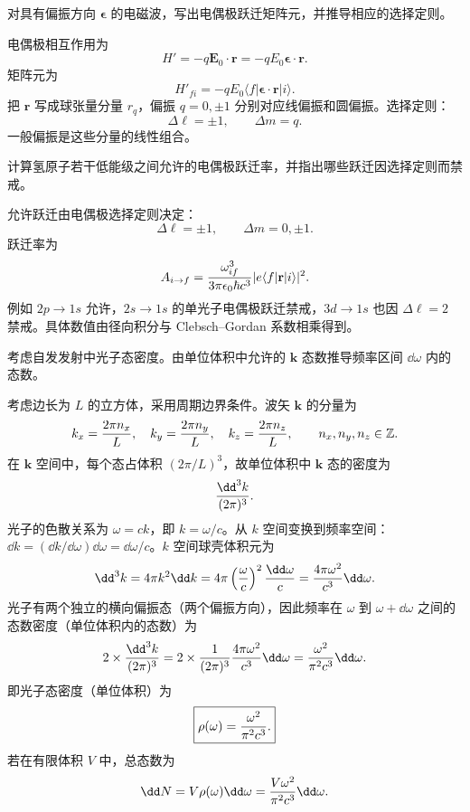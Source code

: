 \begin{question}
对具有偏振方向 $\boldsymbol\epsilon$ 的电磁波，写出电偶极跃迁矩阵元，并推导相应的选择定则。
\end{question}
\begin{solution}
电偶极相互作用为
\[
H'=-q\mathbf E_0\cdot\mathbf r=-qE_0\boldsymbol\epsilon\cdot\mathbf r.
\]
矩阵元为
\[
H'_{fi}=-qE_0\langle f|\boldsymbol\epsilon\cdot\mathbf r|i\rangle.
\]
把 $\mathbf r$ 写成球张量分量 $r_q$，偏振 $q=0,\pm1$ 分别对应线偏振和圆偏振。选择定则：
\[
\Delta\ell=\pm1,
\qquad
\Delta m=q.
\]
一般偏振是这些分量的线性组合。
\end{solution}

\begin{question}
计算氢原子若干低能级之间允许的电偶极跃迁率，并指出哪些跃迁因选择定则而禁戒。
\end{question}
\begin{solution}
允许跃迁由电偶极选择定则决定：
\[
\Delta\ell=\pm1,
\qquad \Delta m=0,\pm1.
\]
跃迁率为
\[
A_{i\to f}={\omega_{if}^3\over3\pi\epsilon_0\hbar c^3}|e\langle f|\mathbf r|i\rangle|^2.
\]
例如 $2p\to1s$ 允许，$2s\to1s$ 的单光子电偶极跃迁禁戒，$3d\to1s$ 也因 $\Delta\ell=2$ 禁戒。具体数值由径向积分与 Clebsch--Gordan 系数相乘得到。
\end{solution}

\begin{question}
考虑自发发射中光子态密度。由单位体积中允许的 $\mathbf k$ 态数推导频率区间 $\dd\omega$ 内的态数。
\end{question}
\begin{solution}
考虑边长为 $L$ 的立方体，采用周期边界条件。波矢 $\mathbf k$ 的分量为
\[
k_x={2\pi n_x\over L},\quad k_y={2\pi n_y\over L},\quad k_z={2\pi n_z\over L},\qquad n_x,n_y,n_z\in\mathbb Z.
\]
在 $\mathbf k$ 空间中，每个态占体积 $(2\pi/L)^3$，故单位体积中 $\mathbf k$ 态的密度为
\[
{\dd^3k\over(2\pi)^3}.
\]
光子的色散关系为 $\omega=ck$，即 $k=\omega/c$。从 $k$ 空间变换到频率空间：$\dd k=(\dd k/\dd\omega)\dd\omega=\dd\omega/c$。$k$ 空间球壳体积元为
\[
\dd^3k=4\pi k^2\dd k=4\pi\left({\omega\over c}\right)^2{\dd\omega\over c}
={4\pi\omega^2\over c^3}\dd\omega.
\]
光子有两个独立的横向偏振态（两个偏振方向），因此频率在 $\omega$ 到 $\omega+\dd\omega$ 之间的态数密度（单位体积内的态数）为
\[
2\times{\dd^3k\over(2\pi)^3}
=2\times{1\over(2\pi)^3}{4\pi\omega^2\over c^3}\dd\omega
={\omega^2\over\pi^2c^3}\dd\omega.
\]
即光子态密度（单位体积）为
\[
\boxed{\rho(\omega)={\omega^2\over\pi^2c^3}.}
\]
若在有限体积 $V$ 中，总态数为
\[
\dd N=V\rho(\omega)\dd\omega={V\omega^2\over\pi^2c^3}\dd\omega.
\]
\end{solution}

